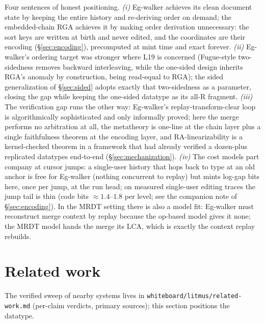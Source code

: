 \documentclass[11pt]{article}
\newcommand{\code}[1]{\texttt{#1}}
\begin{document}
\noindent Four sentences of honest positioning. \emph{(i)} Eg-walker
achieves its clean document state by keeping the entire history and
re-deriving order on demand; the embedded-chain RGA achieves it by
making order derivation unnecessary: the sort keys are written at
birth and never edited, and the coordinates are their encoding
(\S\ref{sec:encoding}), precomputed at mint time and exact forever.
\emph{(ii)} Eg-walker's ordering target was stronger where L19 is
concerned (Fugue-style two-sidedness removes backward interleaving,
while the one-sided design inherits RGA's anomaly by construction,
being read-equal to RGA); the sided generalization of
\S\ref{sec:sided} adopts exactly that two-sidedness as a parameter,
closing the gap while keeping the one-sided datatype as its all-R
fragment. \emph{(iii)} The verification gap runs
the other way: Eg-walker's replay-transform-clear loop is
algorithmically sophisticated and only informally proved; here the
merge performs no arbitration at all, the metatheory is one-line at
the chain layer plus a single faithfulness theorem at the encoding
layer, and RA-linearizability is a kernel-checked theorem in a
framework that had already verified a dozen-plus replicated
datatypes end-to-end (\S\ref{sec:mechanization}). \emph{(iv)} The
cost models part company at cursor jumps: a single-user history that
hops back to type at an old anchor is free for Eg-walker (nothing
concurrent to replay) but mints log-gap bits here, once per jump, at
the run head; on measured single-user editing traces the jump tail
is thin (code bits $\approx 1.4$--$1.8$ per level; see the companion
note of \S\ref{sec:encoding}). In the MRDT setting there is also a model
fit: Eg-walker must reconstruct merge context by replay because the
op-based model gives it none; the MRDT model hands the merge its LCA,
which is exactly the context replay rebuilds.

\section{Related work}
\label{sec:related}

The verified sweep of nearby systems lives in
\code{whiteboard/litmus/related-work.md} (per-claim verdicts, primary
sources); this section positions the datatype.
\end{document}
